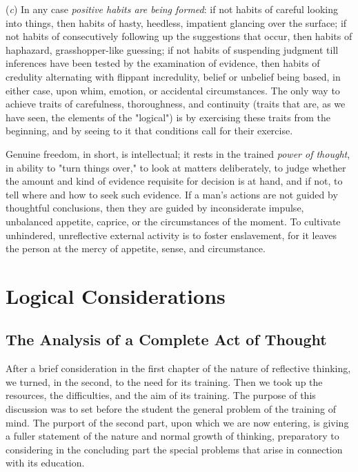 \documentclass[showtrims,ustradepaper]{memoir}
\begin{document}

(\emph{c}) In any case \emph{positive habits are being formed}: if not
habits of careful looking into things, then habits of hasty, heedless,
impatient glancing over the surface; if not habits of consecutively
following up the suggestions that occur, then habits of haphazard,
grasshopper-like guessing; if not habits of suspending judgment till
inferences have been tested by the examination of evidence, then habits
of credulity alternating with flippant incredulity, belief or unbelief
being based, in either case, upon whim, emotion, or accidental
circumstances. The only way to achieve traits of carefulness,
thoroughness, and continuity (traits that are, as we have seen, the
elements of the "logical") is by exercising these traits from the
beginning, and by seeing to it that conditions call for their exercise.


Genuine freedom, in short, is intellectual; it rests in the trained
\emph{power of thought}, in ability to "turn things over," to look at
matters deliberately, to judge whether the amount and kind of evidence
requisite for
decision
is at hand, and if not, to tell where and how to seek such evidence. If
a man's actions are not guided by thoughtful conclusions, then they are
guided by inconsiderate impulse, unbalanced appetite, caprice, or the
circumstances of the moment. To cultivate unhindered, unreflective
external activity is to foster enslavement, for it leaves the person at
the mercy of appetite, sense, and
circumstance.

\part{Logical Considerations}

\chapter{The Analysis of a Complete Act of Thought}


After a brief consideration in the first chapter of the nature of
reflective thinking, we turned, in the second, to the need for its
training. Then we took up the resources, the difficulties, and the aim
of its training. The purpose of this discussion was to set before the
student the general problem of the training of mind. The purport of the
second part, upon which we are now entering, is giving a fuller
statement of the nature and normal growth of thinking, preparatory to
considering in the concluding part the special problems that arise in
connection with its education.
\end{document}
